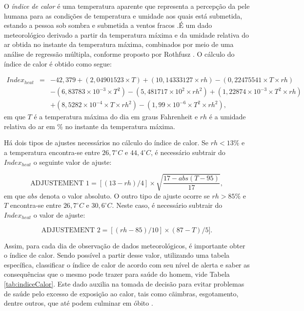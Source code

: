 O \emph{índice de calor} é uma temperatura aparente que representa a percepção da pele humana para as condições de temperatura e umidade aos quais está submetida, estando a pessoa sob sombra e submetida a ventos fracos \cite{Steadman:IndiceCalor}.É um dado meteorológico derivado a partir da temperatura máxima e da umidade relativa do ar obtida no instante da temperatura máxima, combinados por meio de uma análise de regressão múltipla, conforme proposto por Rothfusz \cite{Rothfusz:HeatIndex}. O cálculo do índice de calor é obtido como segue:

\begin{eqnarray}
Index_{heat} &=& - 42,379 + (2,04901523 \times T) + (10,14333127 \times rh) - (0,22475541 \times T \times rh) \nonumber\\
& \ &  - (6,83783 \times 10^{-3}\times T^2) - (5,481717 \times 10^2 \times rh^2) + (1,22874 \times 10^{-3} \times T^2 \times rh)  \nonumber\\
& \ &  + (8,5282 \times 10^{-4} \times T \times rh^2) - (1,99 \times 10^{-6} \times T^2 \times rh^2),
\end{eqnarray} em que $T$ é a temperatura máxima do dia em graus Fahrenheit e $rh$ é a umidade relativa do ar em \% no instante da temperatura máxima.

Há dois tipos de ajustes necessários no cálculo do índice de calor. Se $rh < 13\%$ e a temperatura encontra-se entre $26,7 ^{\circ}C$ e $44,4 ^{\circ}C$, é necessário subtrair do $Index_{heat}$ o seguinte valor de ajuste:

\begin{equation}
\textrm{ADJUSTEMENT 1} = [(13-rh)/4] \times \sqrt{\frac{17 - abs(T - 95)}{17}},
\end{equation} em que $abs$ denota o valor absoluto. O outro tipo de ajuste ocorre se $rh > 85\%$ e $T$ encontra-se entre $26,7 ^{\circ}C$ e $30,6 ^{\circ}C$. Neste caso, é necessário subtrair do $Index_{heat}$ o valor de ajuste:

\begin{equation}
\textrm{ADJUSTEMENT 2} = [(rh - 85)/10]\times(87-T)/5].
\end{equation} 

Assim, para cada dia de observação de dados meteorológicos, é importante obter o índice de calor. Sendo possível a partir desse valor, utilizando uma tabela específica, classificar o índice de calor de acordo com seu nível de alerta e saber as consequências que o mesmo pode trazer para saúde do homem, vide Tabela \ref{tab:indiceCalor}. Este dado auxilia na tomada de decisão para evitar problemas de saúde pelo excesso de exposição ao calor, tais como cãimbras, esgotamento, dentre outros, que até podem culminar em óbito \cite{Silva:CalorTrabalho,Lima:Artigo}.

